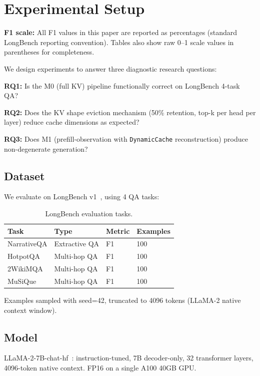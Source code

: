 \section{Experimental Setup}
\label{sec:setup}

\textbf{F1 scale:} All F1 values in this paper are reported as percentages (standard LongBench reporting convention). Tables also show raw 0--1 scale values in parentheses for completeness.

We design experiments to answer three diagnostic research questions:

\textbf{RQ1:} Is the M0 (full KV) pipeline functionally correct on LongBench 4-task QA?

\textbf{RQ2:} Does the KV shape eviction mechanism (50\% retention, top-k per head per layer) reduce cache dimensions as expected?

\textbf{RQ3:} Does M1 (prefill-observation with \texttt{DynamicCache} reconstruction) produce non-degenerate generation?

\subsection{Dataset}

We evaluate on LongBench v1~\cite{bai2023longbench}, using 4 QA tasks:

\begin{table}[h]
\centering
\caption{LongBench evaluation tasks.}
\label{tab:tasks}
\begin{tabular}{llll}
\toprule
Task & Type & Metric & Examples \\
\midrule
NarrativeQA & Extractive QA & F1 & 100 \\
HotpotQA & Multi-hop QA & F1 & 100 \\
2WikiMQA & Multi-hop QA & F1 & 100 \\
MuSiQue & Multi-hop QA & F1 & 100 \\
\bottomrule
\end{tabular}
\end{table}

Examples sampled with seed=42, truncated to 4096 tokens (LLaMA-2 native context window).

\subsection{Model}

LLaMA-2-7B-chat-hf~\cite{Touvron2023LLaMA2}: instruction-tuned, 7B decoder-only, 32 transformer layers, 4096-token native context. FP16 on a single A100 40GB GPU.


